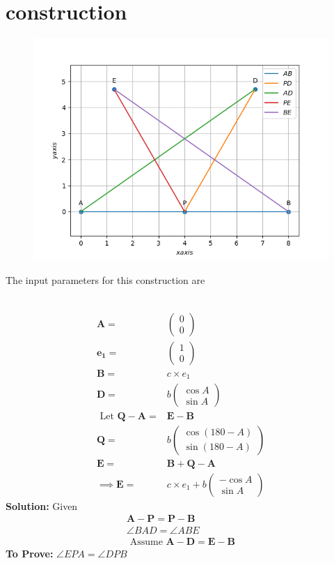 \documentclass[10pt]{article}
\newcommand{\solution}{\noindent \textbf{Solution: }}
\newcommand{\myvec}[1]{\ensuremath{\begin{pmatrix}#1\end{pmatrix}}}
\let\vec\mathbf{}
\begin{document}
\section{construction}
\begin{figure}[h!]
	\begin{center}
		\includegraphics[width=5in]{./figs/fig.png}
	\end{center}
\caption{}
\label{fig:Fig1}
\end{figure}
The input parameters for this construction are\\
\begin{table}[h!]
	\centering
 	
\caption{}
\label{table}
\end{table}\\
\begin{align}
	\vec{A}=&\myvec{0\\0}\\
	\vec{e_1}=&\myvec{1\\0}\\
	\vec{B}=&c\times e_1\\
	\vec{D}=&b\myvec{\cos{A}\\\sin{A}}\\
	\text{ Let  }\vec{Q}-\vec{A} =& \vec{E}-\vec{B}\\
	\vec{Q}=&b\myvec{\cos{(180-A)}\\\sin{(180-A)}}\\
	\vec{E}=&\vec{B}+\vec{Q}-\vec{A}\\
	\implies\vec{E}=&c\times e_1+b\myvec{-\cos{A}\\\sin{A}}
\end{align}
\solution
Given\\
\begin{align}
\vec{A}-\vec{P} = \vec{P}-\vec{B}\\
\angle BAD = \angle ABE\\
\text { Assume  }\vec{A}-\vec{D}=\vec{E}-\vec{B}
\end{align}
\textbf{To Prove:}  $\angle EPA = \angle DPB$
\end{document}
